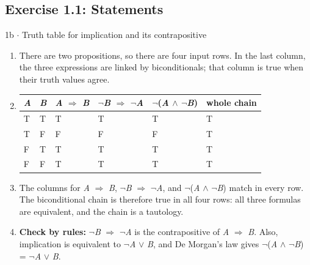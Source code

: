 \documentclass[11pt]{article}
\begin{document}
\begin{keepsection}\subsection{Exercise 1.1: Statements}

\begin{workedbox}{1b \ensuremath{\cdot} Truth table for implication and its contrapositive}
\begin{enumerate}
\item There are two propositions, so there are four input rows. In the last column, the three expressions are linked by biconditionals; that column is true when their truth values agree.
\item {}
\begin{center}\small\begin{tabularx}{\linewidth}{>{\raggedright\arraybackslash}X>{\raggedright\arraybackslash}X>{\raggedright\arraybackslash}X>{\raggedright\arraybackslash}X>{\raggedright\arraybackslash}X>{\raggedright\arraybackslash}X}\toprule
\textbf{\textit{A}} & \textbf{\textit{B}} & \textbf{\textit{A} \ensuremath{\Rightarrow} \textit{B}} & \textbf{\ensuremath{\neg}\textit{B} \ensuremath{\Rightarrow} \ensuremath{\neg}\textit{A}} & \textbf{\ensuremath{\neg}(\textit{A} \ensuremath{\land} \ensuremath{\neg}\textit{B})} & \textbf{whole chain} \\ \midrule
T & T & T & T & T & T \\
T & F & F & F & F & T \\
F & T & T & T & T & T \\
F & F & T & T & T & T \\
\bottomrule\end{tabularx}\end{center}
\item The columns for \textit{A} \ensuremath{\Rightarrow} \textit{B}, \ensuremath{\neg}\textit{B} \ensuremath{\Rightarrow} \ensuremath{\neg}\textit{A}, and \ensuremath{\neg}(\textit{A} \ensuremath{\land} \ensuremath{\neg}\textit{B}) match in every row. The biconditional chain is therefore true in all four rows: all three formulas are equivalent, and the chain is a tautology.
\item \textbf{Check by rules:} \ensuremath{\neg}\textit{B} \ensuremath{\Rightarrow} \ensuremath{\neg}\textit{A} is the contrapositive of \textit{A} \ensuremath{\Rightarrow} \textit{B}. Also, implication is equivalent to \ensuremath{\neg}\textit{A} \ensuremath{\lor} \textit{B}, and De Morgan’s law gives \ensuremath{\neg}(\textit{A} \ensuremath{\land} \ensuremath{\neg}\textit{B}) = \ensuremath{\neg}\textit{A} \ensuremath{\lor} \textit{B}.
\end{enumerate}
\end{workedbox}

\end{keepsection}
\end{document}
